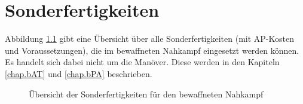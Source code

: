 %

\chapter{Sonderfertigkeiten}
Abbildung \ref{fig.nSF} gibt eine Übersicht über alle Sonderfertigkeiten (mit AP-Kosten und Voraussetzungen), die im bewaffneten Nahkampf eingesetzt werden können.
Es handelt sich dabei nicht um die Manöver.
Diese werden in den Kapiteln \ref{chap.bAT} und \ref{chap.bPA} beschrieben.

\begin{figure}
    \centering
    \caption{Übersicht der Sonderfertigkeiten für den bewaffneten Nahkampf}
    \label{fig.nSF}
\end{figure}

